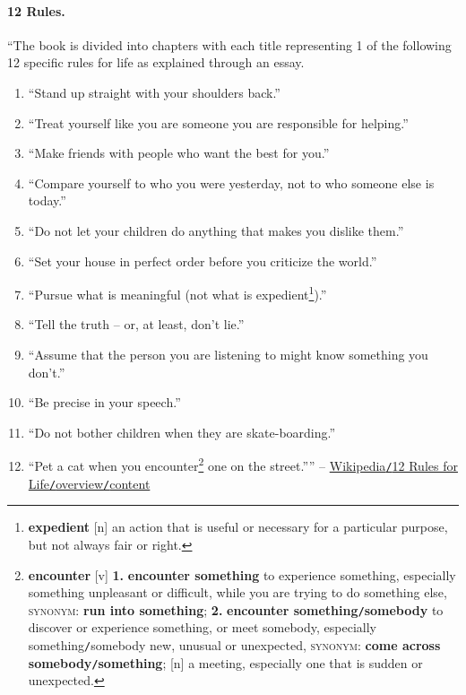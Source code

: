 \documentclass{article}
\begin{document}
\paragraph*{12 Rules.} ``The book is divided into chapters with each title representing 1 of the following 12 specific rules for life as explained through an essay.
\begin{enumerate}
	\item ``Stand up straight with your shoulders back.''
	\item ``Treat yourself like you are someone you are responsible for helping.''
	\item ``Make friends with people who want the best for you.''
	\item ``Compare yourself to who you were yesterday, not to who someone else is today.''
	\item ``Do not let your children do anything that makes you dislike them.''
	\item ``Set your house in perfect order before you criticize the world.''
	\item ``Pursue what is meaningful (not what is expedient\footnote{\textbf{expedient} [n] an action that is useful or necessary for a particular purpose, but not always fair or right.}).''
	\item ``Tell the truth -- or, at least, don't lie.''
	\item ``Assume that the person you are listening to might know something you don't.''
	\item ``Be precise in your speech.''
	\item ``Do not bother children when they are skate-boarding.''
	\item ``Pet a cat when you encounter\footnote{\textbf{encounter} [v] \textbf{1.} \textbf{encounter something} to experience something, especially something unpleasant or difficult, while you are trying to do something else, \textsc{synonym}: \textbf{run into something}; \textbf{2.} \textbf{encounter something{\tt/}somebody} to discover or experience something, or meet somebody, especially something{\tt/}somebody new, unusual or unexpected, \textsc{synonym}: \textbf{come across somebody{\tt/}something}; [n] a meeting, especially one that is sudden or unexpected.} one on the street.'''' -- \href{https://en.wikipedia.org/wiki/12_Rules_for_Life#12_Rules}{Wikipedia{\tt/}12 Rules for Life{\tt/}overview{\tt/}content}
\end{enumerate} 
\end{document}
